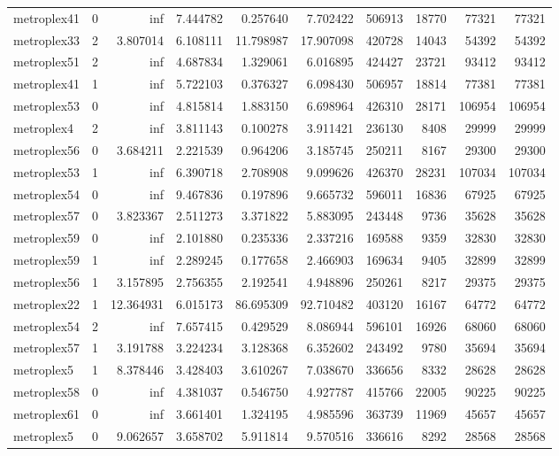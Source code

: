 \begin{longtable}{|l|r|r|r|r|r|r|r|r|r|}
metroplex41 & 0 & inf & 7.444782 & 0.257640 & 7.702422 & 506913 & 18770 & 77321 & 77321 \\
metroplex33 & 2 & 3.807014 & 6.108111 & 11.798987 & 17.907098 & 420728 & 14043 & 54392 & 54392 \\
metroplex51 & 2 & inf & 4.687834 & 1.329061 & 6.016895 & 424427 & 23721 & 93412 & 93412 \\
metroplex41 & 1 & inf & 5.722103 & 0.376327 & 6.098430 & 506957 & 18814 & 77381 & 77381 \\
metroplex53 & 0 & inf & 4.815814 & 1.883150 & 6.698964 & 426310 & 28171 & 106954 & 106954 \\
metroplex4 & 2 & inf & 3.811143 & 0.100278 & 3.911421 & 236130 & 8408 & 29999 & 29999 \\
metroplex56 & 0 & 3.684211 & 2.221539 & 0.964206 & 3.185745 & 250211 & 8167 & 29300 & 29300 \\
metroplex53 & 1 & inf & 6.390718 & 2.708908 & 9.099626 & 426370 & 28231 & 107034 & 107034 \\
metroplex54 & 0 & inf & 9.467836 & 0.197896 & 9.665732 & 596011 & 16836 & 67925 & 67925 \\
metroplex57 & 0 & 3.823367 & 2.511273 & 3.371822 & 5.883095 & 243448 & 9736 & 35628 & 35628 \\
metroplex59 & 0 & inf & 2.101880 & 0.235336 & 2.337216 & 169588 & 9359 & 32830 & 32830 \\
metroplex59 & 1 & inf & 2.289245 & 0.177658 & 2.466903 & 169634 & 9405 & 32899 & 32899 \\
metroplex56 & 1 & 3.157895 & 2.756355 & 2.192541 & 4.948896 & 250261 & 8217 & 29375 & 29375 \\
metroplex22 & 1 & 12.364931 & 6.015173 & 86.695309 & 92.710482 & 403120 & 16167 & 64772 & 64772 \\
metroplex54 & 2 & inf & 7.657415 & 0.429529 & 8.086944 & 596101 & 16926 & 68060 & 68060 \\
metroplex57 & 1 & 3.191788 & 3.224234 & 3.128368 & 6.352602 & 243492 & 9780 & 35694 & 35694 \\
metroplex5 & 1 & 8.378446 & 3.428403 & 3.610267 & 7.038670 & 336656 & 8332 & 28628 & 28628 \\
metroplex58 & 0 & inf & 4.381037 & 0.546750 & 4.927787 & 415766 & 22005 & 90225 & 90225 \\
metroplex61 & 0 & inf & 3.661401 & 1.324195 & 4.985596 & 363739 & 11969 & 45657 & 45657 \\
metroplex5 & 0 & 9.062657 & 3.658702 & 5.911814 & 9.570516 & 336616 & 8292 & 28568 & 28568 \\

\end{longtable}
